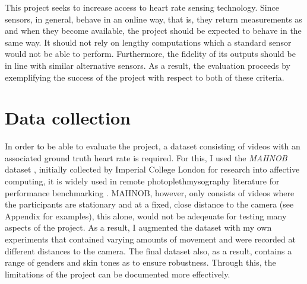 This project seeks to increase access to heart rate sensing technology.
Since sensors, in general, behave in an online way, that is, they return measurements as and when they become available, the project should be expected to behave in the same way.
It should not rely on lengthy computations which a standard sensor would not be able to perform. 
Furthermore, the fidelity of its outputs should be in line with similar alternative sensors.
As a result, the evaluation proceeds by exemplifying the success of the project with respect to both of these criteria.

\section{Data collection}
In order to be able to evaluate the project, a dataset consisting of videos with an associated ground truth heart rate is required.
For this, I used the \textit{MAHNOB} dataset \cite{Mahnob}, initially collected by Imperial College London for research into affective computing, it is widely used in remote photoplethmysography literature for performance benchmarking \cite{novel}\cite{mahnob-example}\cite{mahnob-example-2}.
MAHNOB, however, only consists of videos where the participants are stationary and at a fixed, close distance to the camera (see Appendix for examples), this alone, would not be adeqeuate for testing many aspects of the project.
As a result, I augmented the dataset with my own experiments that contained varying amounts of movement and were recorded at different distances to the camera. 
The final dataset also, as a result, contains a range of genders and skin tones as to ensure robustness.
Through this, the limitations of the project can be documented more effectively.

